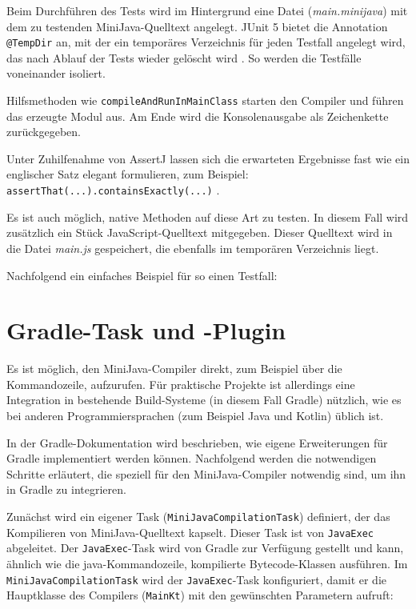 Beim Durchführen des Tests wird im Hintergrund eine Datei (\emph{main.minijava}) mit dem zu testenden MiniJava-Quelltext angelegt. JUnit 5 bietet die Annotation \lstinline{@TempDir} an, mit der ein temporäres Verzeichnis für jeden Testfall angelegt wird, das nach Ablauf der Tests wieder gelöscht wird \cite{JUnit}. So werden die Testfälle voneinander isoliert.

Hilfsmethoden wie \lstinline{compileAndRunInMainClass} starten den Compiler und führen das erzeugte Modul aus. Am Ende wird die Konsolenausgabe als Zeichenkette zurückgegeben.

Unter Zuhilfenahme von AssertJ lassen sich die erwarteten Ergebnisse fast wie ein englischer Satz elegant formulieren, zum Beispiel: \lstinline{assertThat(...).containsExactly(...)} \cite{AssertJ}.

Es ist auch möglich, native Methoden auf diese Art zu testen. In diesem Fall wird zusätzlich ein Stück JavaScript-Quelltext mitgegeben. Dieser Quelltext wird in die Datei \emph{main.js} gespeichert, die ebenfalls im temporären Verzeichnis liegt.

Nachfolgend ein einfaches Beispiel für so einen Testfall:



\section{Gradle-Task und -Plugin}
\label{sec:GradleTask-und-Plugin}

Es ist möglich, den MiniJava-Compiler direkt, zum Beispiel über die Kommandozeile, aufzurufen. Für praktische Projekte ist allerdings eine Integration in bestehende Build-Systeme (in diesem Fall Gradle) nützlich, wie es bei anderen Programmiersprachen (zum Beispiel Java und Kotlin) üblich ist.

In der Gradle-Dokumentation \cite{Gradle} wird beschrieben, wie eigene Erweiterungen für Gradle implementiert werden können. Nachfolgend werden die notwendigen Schritte erläutert, die speziell für den MiniJava-Compiler notwendig sind, um ihn in Gradle zu integrieren.

Zunächst wird ein eigener Task (\lstinline{MiniJavaCompilationTask}) definiert, der das Kompilieren von MiniJava-Quelltext kapselt. Dieser Task ist von \lstinline{JavaExec} abgeleitet. Der \lstinline{JavaExec}-Task wird von Gradle zur Verfügung gestellt und kann, ähnlich wie die java-Komman\-dozeile, kompilierte Bytecode-Klassen ausführen. Im \lstinline{MiniJavaCompilationTask} wird der \lstinline{JavaExec}-Task konfiguriert, damit er die Hauptklasse des Compilers (\lstinline{MainKt}) mit den gewünschten Parametern aufruft:

